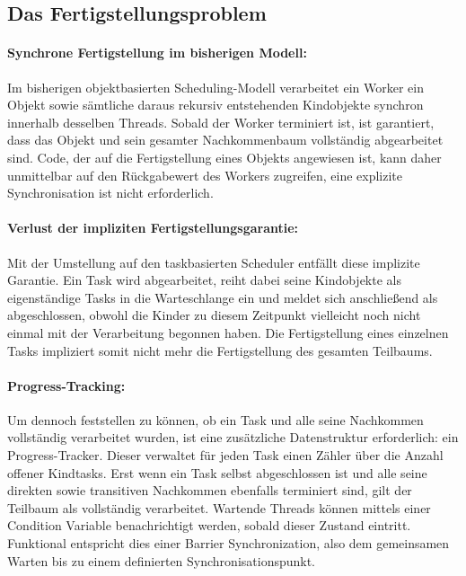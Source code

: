 \begin{sloppypar}
\subsection{Das Fertigstellungsproblem}

\paragraph{Synchrone Fertigstellung im bisherigen Modell:}
Im bisherigen objektbasierten Scheduling-Modell verarbeitet ein Worker ein Objekt
sowie sämtliche daraus rekursiv entstehenden Kindobjekte synchron innerhalb desselben Threads.
Sobald der Worker terminiert ist, ist garantiert, dass das Objekt und sein gesamter Nachkommenbaum vollständig abgearbeitet sind.
Code, der auf die Fertigstellung eines Objekts angewiesen ist,
kann daher unmittelbar auf den Rückgabewert des Workers zugreifen, eine explizite Synchronisation ist nicht erforderlich.

\paragraph{Verlust der impliziten Fertigstellungsgarantie:}
Mit der Umstellung auf den taskbasierten Scheduler entfällt diese implizite Garantie.
Ein Task wird abgearbeitet, reiht dabei seine Kindobjekte als eigenständige Tasks in die Warteschlange ein
und meldet sich anschließend als abgeschlossen, obwohl die Kinder zu diesem Zeitpunkt vielleicht
noch nicht einmal mit der Verarbeitung begonnen haben.
Die Fertigstellung eines einzelnen Tasks impliziert somit nicht mehr die Fertigstellung des gesamten Teilbaums.

\paragraph{Progress-Tracking:}
Um dennoch feststellen zu können, ob ein Task und alle seine Nachkommen vollständig verarbeitet wurden,
ist eine zusätzliche Datenstruktur erforderlich: ein Progress-Tracker.
Dieser verwaltet für jeden Task einen Zähler über die Anzahl offener Kindtasks.
Erst wenn ein Task selbst abgeschlossen ist und alle seine direkten sowie transitiven Nachkommen ebenfalls terminiert sind,
gilt der Teilbaum als vollständig verarbeitet.
Wartende Threads können mittels einer Condition Variable benachrichtigt werden, sobald dieser Zustand eintritt.
Funktional entspricht dies einer Barrier Synchronization, also dem gemeinsamen Warten bis zu einem definierten Synchronisationspunkt.


\end{sloppypar}

